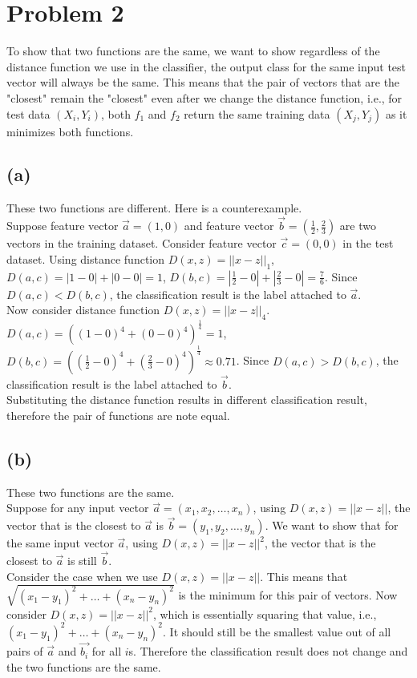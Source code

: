 \documentclass[11pt]{article}
\begin{document}
\pagebreak
\section{Problem 2}
To show that two functions are the same, we want to show regardless of the distance function we use in the classifier, the output class for the same input test vector will always be the same. This means that the pair of vectors that are the "closest" remain the "closest" even after we change the distance function, i.e., for test data $(X_i,Y_i)$, both $f_1$ and $f_2$ return the same training data $(X_j,Y_j)$ as it minimizes both functions.

\subsection{(a)}
These two functions are different. Here is a counterexample. \\
Suppose feature vector $\Vec{a}=(1,0)$ and feature vector $\Vec{b}=(\frac{1}{2},\frac{2}{3})$ are two vectors in the training dataset. Consider feature vector $\Vec{c}=(0,0)$ in the test dataset. Using distance function $D(x,z)=||x-z||_1$, $D(a,c)=|1-0|+|0-0|=1$, $D(b,c)=|\frac{1}{2}-0|+|\frac{2}{3}-0|=\frac{7}{6}$. Since $D(a,c)<D(b,c)$, the classification result is the label attached to $\Vec{a}$.\\
Now consider distance function $D(x,z)=||x-z||_4$. $D(a,c)=((1-0)^4+(0-0)^4)^{\frac{1}{4}}=1$, $D(b,c)=((\frac{1}{2}-0)^4+(\frac{2}{3}-0)^4)^{\frac{1}{4}}\approx0.71$. Since $D(a,c)>D(b,c)$, the classification result is the label attached to $\Vec{b}$.\\
Substituting the distance function results in different classification result, therefore the pair of functions are note equal.

\subsection{(b)}
These two functions are the same. \\
Suppose for any input vector $\Vec{a}=(x_1,x_2,\ldots,x_n)$, using $D(x,z)=||x-z||$, the vector that is the closest to $\Vec{a}$ is $\Vec{b}=(y_1,y_2,\ldots,y_n)$. We want to show that for the same input vector $\Vec{a}$, using $D(x,z)=||x-z||^2$, the vector that is the closest to $\Vec{a}$ is still $\Vec{b}$. \\
Consider the case when we use $D(x,z)=||x-z||$. This means that $\sqrt{(x_1-y_1)^2+\ldots+(x_n-y_n)^2}$ is the minimum for this pair of vectors. Now consider $D(x,z)=||x-z||^2$, which is essentially squaring that value, i.e., $(x_1-y_1)^2+\ldots+(x_n-y_n)^2$. It should still be the smallest value out of all pairs of $\Vec{a}$ and $\Vec{b_i}$ for all $i$s. Therefore the classification result does not change and the two functions are the same.
\end{document}
